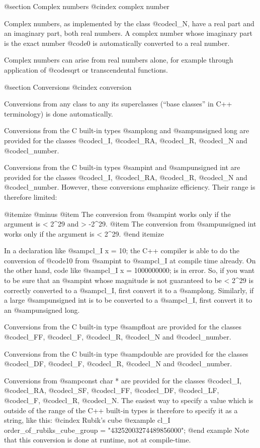 @section Complex numbers
@cindex complex number

Complex numbers, as implemented by the class @code{cl_N}, have a real
part and an imaginary part, both real numbers. A complex number whose
imaginary part is the exact number @code{0} is automatically converted
to a real number.

Complex numbers can arise from real numbers alone, for example
through application of @code{sqrt} or transcendental functions.


@section Conversions
@cindex conversion

Conversions from any class to any its superclasses (``base classes'' in
C++ terminology) is done automatically.

Conversions from the C built-in types @samp{long} and @samp{unsigned long}
are provided for the classes @code{cl_I}, @code{cl_RA}, @code{cl_R},
@code{cl_N} and @code{cl_number}.

Conversions from the C built-in types @samp{int} and @samp{unsigned int}
are provided for the classes @code{cl_I}, @code{cl_RA}, @code{cl_R},
@code{cl_N} and @code{cl_number}. However, these conversions emphasize
efficiency. Their range is therefore limited:

@itemize @minus
@item
The conversion from @samp{int} works only if the argument is < 2^29 and > -2^29.
@item
The conversion from @samp{unsigned int} works only if the argument is < 2^29.
@end itemize

In a declaration like @samp{cl_I x = 10;} the C++ compiler is able to
do the conversion of @code{10} from @samp{int} to @samp{cl_I} at compile time
already. On the other hand, code like @samp{cl_I x = 1000000000;} is
in error.
So, if you want to be sure that an @samp{int} whose magnitude is not guaranteed
to be < 2^29 is correctly converted to a @samp{cl_I}, first convert it to a
@samp{long}. Similarly, if a large @samp{unsigned int} is to be converted to a
@samp{cl_I}, first convert it to an @samp{unsigned long}.

Conversions from the C built-in type @samp{float} are provided for the classes
@code{cl_FF}, @code{cl_F}, @code{cl_R}, @code{cl_N} and @code{cl_number}.

Conversions from the C built-in type @samp{double} are provided for the classes
@code{cl_DF}, @code{cl_F}, @code{cl_R}, @code{cl_N} and @code{cl_number}.

Conversions from @samp{const char *} are provided for the classes
@code{cl_I}, @code{cl_RA},
@code{cl_SF}, @code{cl_FF}, @code{cl_DF}, @code{cl_LF}, @code{cl_F},
@code{cl_R}, @code{cl_N}.
The easiest way to specify a value which is outside of the range of the
C++ built-in types is therefore to specify it as a string, like this:
@cindex Rubik's cube
@example
   cl_I order_of_rubiks_cube_group = "43252003274489856000";
@end example
Note that this conversion is done at runtime, not at compile-time.

